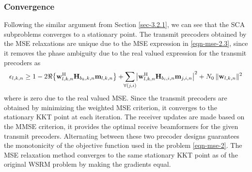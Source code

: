 \subsubsection*{Convergence}
Following the similar argument from Section \ref{sec-3.2.1}, we can see that the \ac{SCA} subproblems converges to a stationary point. The transmit precoders obtained by the \ac{MSE} relaxations are unique due to the \ac{MSE} expression in \eqref{eqn-mse-2.3}, since it removes the phase ambiguity due to the real valued expression for the transmit precoders as
\begin{equation}
\epsilon_{l,k,n} \geq  1 - 2 \Re{ \left \lbrace \mvec{w}{l,k,n}^\herm \mvec{H}{b_k,k,n} \mvec{m}{l,k,n} \right \rbrace} + \sum_{\mathclap{\forall (j,i)}} \left | \mvec{w}{l,k,n}^\herm \mvec{H}{b_i,i,n} \mvec{m}{j,i,n} \right |^2 + N_0 \, \|\mvec{w}{l,k,n}\|^2
\end{equation}
where  is zero due to the real valued \ac{MSE}. Since the transmit precoders are obtained by minimizing the weighted \ac{MSE} criterion, it converges to the stationary \ac{KKT} point at each iteration. The receiver updates are made based on the \ac{MMSE} criterion, it provides the optimal receive beamformers for the given transmit precoders. Alternating between these two precoder designs guarantees the monotonicity of the objective function used in the problem \eqref{eqn-mse-2}. The \ac{MSE} relaxation method converges to the same stationary \ac{KKT} point as of the original \ac{WSRM} problem by making the gradients equal.

